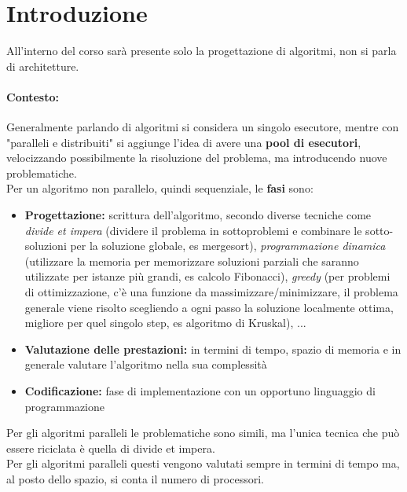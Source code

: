 \section*{Introduzione}
All'interno del corso sarà presente solo la progettazione di algoritmi, non si parla di architetture.\\

\paragraph{Contesto:} Generalmente parlando di algoritmi si considera un singolo esecutore, mentre con "paralleli e distribuiti" si aggiunge l'idea di avere una \textbf{pool di esecutori}, velocizzando possibilmente la risoluzione del problema, ma introducendo nuove problematiche. \\
Per un algoritmo non parallelo, quindi sequenziale, le \textbf{fasi} sono: 
\begin{itemize}
	\item \textbf{Progettazione:} scrittura dell'algoritmo, secondo diverse tecniche come \textit{divide et impera} (dividere il problema in sottoproblemi e combinare le sotto-soluzioni per la soluzione globale, es mergesort), \textit{programmazione dinamica} (utilizzare la memoria per memorizzare soluzioni parziali che saranno utilizzate per istanze più grandi, es calcolo Fibonacci), \textit{greedy} (per problemi di ottimizzazione, c'è una funzione da massimizzare/minimizzare, il problema generale viene risolto scegliendo a ogni passo la soluzione localmente ottima, migliore per quel singolo step, es algoritmo di Kruskal), ...
	
	\item \textbf{Valutazione delle prestazioni:} in termini di tempo, spazio di memoria e in generale valutare l'algoritmo nella sua complessità
	
	\item \textbf{Codificazione:} fase di implementazione con un opportuno linguaggio di programmazione
\end{itemize}

Per gli algoritmi paralleli le problematiche sono simili, ma l'unica tecnica che può essere riciclata è quella di divide et impera.  \\
Per gli algoritmi paralleli questi vengono valutati sempre in termini di tempo ma, al posto dello spazio, si conta il numero di processori. \\

